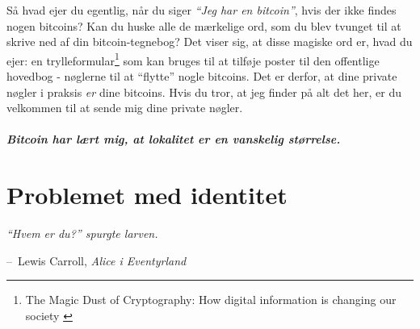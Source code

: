 \documentclass[paper=6in:9in,pagesize=pdftex,
               headinclude=on,footinclude=on,12pt]{scrbook}
\makeatletter
\newenvironment{chapquote}[2][4em]{\setlength{\@tempdima}{#1}%
   \def\chapquote@author{#2}%
   \parshape 1 \@tempdima \dimexpr\textwidth-2\@tempdima\relax%
   \itshape}{\par\normalfont\hfill--\ \chapquote@author\hspace*{\@tempdima}\par\bigskip}
\makeatother
\begin{document}
Så hvad ejer du egentlig, når du siger \textit{\enquote{Jeg har en bitcoin}}, hvis der ikke findes nogen bitcoins? Kan du huske alle de mærkelige ord, som du blev tvunget til at skrive ned af din bitcoin-tegnebog? Det viser sig, at disse magiske ord er, hvad du ejer: en trylleformular\footnote{The Magic Dust of Cryptography: How digital information is changing our society \cite{gigi:magic-spell}} som kan bruges til at tilføje poster til den offentlige hovedbog - nøglerne til at \enquote{flytte} nogle bitcoins. Det er derfor, at dine private nøgler i praksis \textit{er} dine bitcoins. Hvis du tror, at jeg finder på alt det her, er du velkommen til at sende mig dine private nøgler.\paragraph{Bitcoin har lært mig, at lokalitet er en vanskelig størrelse.}%
%
%
%
%
%
%
%

\chapter{Problemet med identitet}
\label{les:4}

\begin{chapquote}{Lewis Carroll, \textit{Alice i Eventyrland}} \enquote{Hvem er du?} spurgte larven. \end{chapquote}
\end{document}
